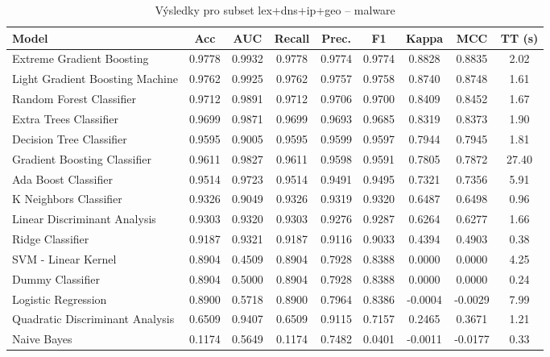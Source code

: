 \begin{table}[H]
  \centering
  \small
  \caption{Výsledky pro subset lex+dns+ip+geo – malware}
  \begin{tabular}{|l|c|c|c|c|c|c|c|c|}
    \hline
    \textbf{Model} & \textbf{Acc} & \textbf{AUC} & \textbf{Recall} & \textbf{Prec.} & \textbf{F1} & \textbf{Kappa} & \textbf{MCC} & \textbf{TT (s)} \\
    \hline
    Extreme Gradient Boosting & 0.9778 & 0.9932 & 0.9778 & 0.9774 & 0.9774 & 0.8828 & 0.8835 & 2.02 \\
    Light Gradient Boosting Machine & 0.9762 & 0.9925 & 0.9762 & 0.9757 & 0.9758 & 0.8740 & 0.8748 & 1.61 \\
    Random Forest Classifier & 0.9712 & 0.9891 & 0.9712 & 0.9706 & 0.9700 & 0.8409 & 0.8452 & 1.67 \\
    Extra Trees Classifier & 0.9699 & 0.9871 & 0.9699 & 0.9693 & 0.9685 & 0.8319 & 0.8373 & 1.90 \\
    Decision Tree Classifier & 0.9595 & 0.9005 & 0.9595 & 0.9599 & 0.9597 & 0.7944 & 0.7945 & 1.81 \\
    Gradient Boosting Classifier & 0.9611 & 0.9827 & 0.9611 & 0.9598 & 0.9591 & 0.7805 & 0.7872 & 27.40 \\
    Ada Boost Classifier & 0.9514 & 0.9723 & 0.9514 & 0.9491 & 0.9495 & 0.7321 & 0.7356 & 5.91 \\
    K Neighbors Classifier & 0.9326 & 0.9049 & 0.9326 & 0.9319 & 0.9320 & 0.6487 & 0.6498 & 0.96 \\
    Linear Discriminant Analysis & 0.9303 & 0.9320 & 0.9303 & 0.9276 & 0.9287 & 0.6264 & 0.6277 & 1.66 \\
    Ridge Classifier & 0.9187 & 0.9321 & 0.9187 & 0.9116 & 0.9033 & 0.4394 & 0.4903 & 0.38 \\
    SVM - Linear Kernel & 0.8904 & 0.4509 & 0.8904 & 0.7928 & 0.8388 & 0.0000 & 0.0000 & 4.25 \\
    Dummy Classifier & 0.8904 & 0.5000 & 0.8904 & 0.7928 & 0.8388 & 0.0000 & 0.0000 & 0.24 \\
    Logistic Regression & 0.8900 & 0.5718 & 0.8900 & 0.7964 & 0.8386 & -0.0004 & -0.0029 & 7.99 \\
    Quadratic Discriminant Analysis & 0.6509 & 0.9407 & 0.6509 & 0.9115 & 0.7157 & 0.2465 & 0.3671 & 1.21 \\
    Naive Bayes & 0.1174 & 0.5649 & 0.1174 & 0.7482 & 0.0401 & -0.0011 & -0.0177 & 0.33 \\
    \hline
  \end{tabular}
\end{table}
\vspace{0.5cm}

